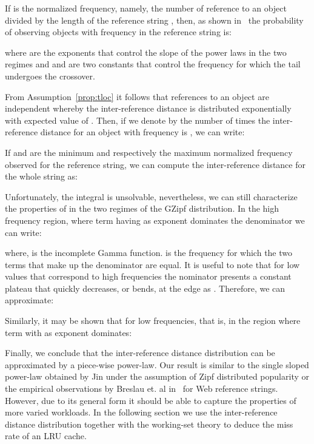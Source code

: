 \documentclass[twocolumn, 10pt]{article}
\theoremstyle{plain}
\begin{document}
If  is the normalized frequency, namely, the number of reference to an
object divided by the length of the reference string , then, as shown
in~\cite{montemurro:gzipf} the probability of observing objects with frequency
 in the reference string is:



\noindent where  are the exponents that control the slope of the
power laws in the two regimes and  and  are two constants that
control the frequency for which the tail undergoes the crossover. 

From Assumption~\ref{prop:tloc} it follows that references to an object are
independent whereby the inter-reference distance  is distributed exponentially
with expected value of . Then, if we denote by  the
number of times the inter-reference distance for an object with frequency
 is , we can write:



If  and  are the minimum and respectively the
maximum normalized frequency observed for the reference string, we can compute
the inter-reference distance for the whole string as:



Unfortunately, the integral is unsolvable, nevertheless, we can still characterize the
properties of  in the two regimes of the GZipf
distribution. In the high frequency region, where term having  as exponent dominates the
denominator we can write:



\noindent where,  is the
incomplete Gamma function.   is the
frequency for which the two terms that make up the denominator are equal. It
is useful to note that for low  values that correspond to high frequencies
the  nominator presents a constant plateau that quickly decreases, or bends,
at the edge as . Therefore, we can approximate:



Similarly, it may be shown that for low frequencies, that is, in the region
where term with  as exponent dominates:




Finally, we conclude that the inter-reference distance distribution can be
approximated by a piece-wise power-law. Our result is similar to the single
sloped power-law obtained by Jin under the assumption of Zipf distributed
popularity or the empirical observations by Breslau et. al
in~\cite{breslau:web_and_zipf} for Web reference strings. However, due to its
general form it should be able to capture the properties of more varied
workloads. 
In the following section we use the inter-reference distance
distribution together with the working-set theory to deduce the miss rate of
an LRU cache. 
\end{document}
